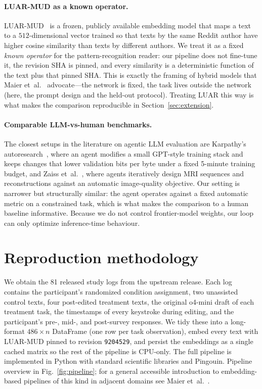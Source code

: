 \documentclass[runningheads]{llncs}
\begin{document}
\paragraph{LUAR-MUD as a known operator.}
LUAR-MUD~\cite{rivera2021luar} is a frozen, publicly available
embedding model that maps a text to a $512$-dimensional vector
trained so that texts by the same Reddit author have higher cosine
similarity than texts by different authors. We treat it as a fixed
\emph{known operator} for the pattern-recognition reader: our
pipeline does not fine-tune it, the revision SHA is pinned, and every
similarity is a deterministic function of the text plus that pinned
SHA. This is exactly the framing of hybrid models that
Maier et~al.~\cite{maier2018precision,maier2022knownoperator}
advocate---the network is fixed, the task lives outside the network
(here, the prompt design and the held-out protocol). Treating LUAR
this way is what makes the comparison reproducible in
Section~\ref{sec:extension}.

\paragraph{Comparable LLM-vs-human benchmarks.}
The closest setups in the literature on agentic LLM evaluation are
Karpathy's autoresearch~\cite{karpathy2026autoresearch}, where an
agent modifies a small GPT-style training stack and keeps changes
that lower validation bits per byte under a fixed 5-minute training
budget, and Zaiss et~al.~\cite{zaiss2026agent4mr}, where agents
iteratively design MRI sequences and reconstructions against an
automatic image-quality objective. Our setting is narrower but
structurally similar: the agent operates against a fixed automatic
metric on a constrained task, which is what makes the comparison to a
human baseline informative. Because we do not control frontier-model
weights, our loop can only optimize inference-time behaviour.

\section{Reproduction methodology}\label{sec:methods-repro}

We obtain the 81 released study logs from the upstream release. Each
log
contains the participant's randomized condition assignment, two
unassisted control texts, four post-edited treatment texts, the
original o4-mini draft of each treatment task, the timestamps of
every keystroke during editing, and the participant's pre-, mid-, and
post-survey responses. We tidy these into a long-format
$486{\times}n$ DataFrame (one row per task observation), embed every
text with LUAR-MUD pinned to revision \texttt{9204529}, and persist
the embeddings as a single cached matrix so the rest of the pipeline
is CPU-only. The full pipeline is implemented in Python with
standard scientific libraries and Pingouin. Pipeline overview in
Fig.~\ref{fig:pipeline}; for a general accessible introduction to
embedding-based pipelines of this kind in adjacent
domains see Maier et~al.~\cite{maier2019gentle}.
\end{document}
